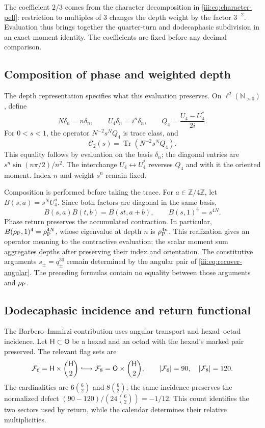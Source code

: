 The coefficient $2/3$ comes from the character decomposition in
\eqref{iii:eq:character-pell}: restriction to multiples of $3$
changes the depth weight by the factor $3^{-2}$. Evaluation
thus brings together the quarter-turn and dodecaphasic subdivision in an
exact moment identity. The coefficients are fixed before any
decimal comparison.

\subsection{Composition of phase and weighted depth}

The depth representation specifies what this evaluation preserves.
On $\ell^2(\mathbb N_{>0})$, define
\[
 N\delta_n=n\delta_n,\qquad U_4\delta_n=i^n\delta_n,
 \qquad Q_4=\frac{U_4-U_4^*}{2i}.
\]
For $0<s<1$, the operator $N^{-2}s^NQ_4$ is trace class, and
\begin{equation}
 \mathcal C_2(s)=\operatorname{Tr}(N^{-2}s^NQ_4).
 \label{iii:eq:pell-depth-trace}
\end{equation}
This equality follows by evaluation on the basis $\delta_n$; the
diagonal entries are $s^n\sin(n\pi/2)/n^2$. The interchange
$U_4\leftrightarrow U_4^*$ reverses $Q_4$ and with it the oriented
moment. Index $n$ and weight $s^n$ remain fixed.

Composition is performed before taking the trace. For
$a\in\mathbb Z/4\mathbb Z$, let $B(s,a)=s^NU_4^a$. Since both
factors are diagonal in the same basis,
\begin{equation}
 B(s,a)B(t,b)=B(st,a+b),\qquad
 B(s,1)^4=s^{4N}.
 \label{iii:eq:pell-depth-composition}
\end{equation}
Phase return preserves the accumulated contraction. In particular,
$B(\rho_{\rm P},1)^4=\rho_{\rm P}^{4N}$, whose eigenvalue at depth
$n$ is $\rho_{\rm P}^{4n}$. This realization gives an operator
meaning to the contractive evaluation; the scalar moment sum
aggregates depths after preserving their index and orientation.
The constitutive arguments $s_\pm=q_\pm^{30}$ remain determined by
the angular pair of \eqref{iii:eq:recover-angular}. The preceding formulas
contain no equality between those arguments and $\rho_{\rm P}$.

\subsection{Dodecaphasic incidence and return functional}

The Barbero--Immirzi contribution uses angular transport and
hexad--octad incidence. Let $\mathsf H\subset\mathsf O$ be a hexad
and an octad with the hexad's marked pair preserved. The relevant flag
sets are
\begin{equation}
 \mathcal F_6=\mathsf H\times\binom{\mathsf H}{2}
 \lhook\joinrel\longrightarrow
 \mathcal F_8=\mathsf O\times\binom{\mathsf H}{2},
 \qquad |\mathcal F_6|=90,\quad |\mathcal F_8|=120.
 \label{iii:eq:barbero-flags}
\end{equation}
The cardinalities are $6\binom62$ and $8\binom62$; the same incidence
preserves the normalized defect
$(90-120)/(24\binom62)=-1/12$. This count identifies the two sectors
used by return, while the calendar determines their
relative multiplicities.

